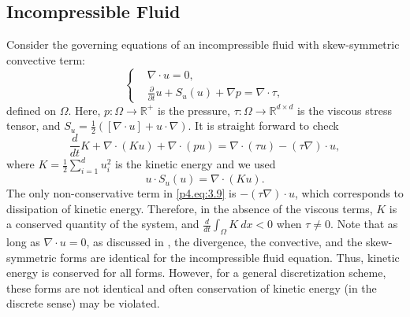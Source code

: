 \subsection{Incompressible Fluid} \label{p4.sec:skew.2}
Consider the governing equations of an incompressible fluid with skew-symmetric convective term:
\begin{equation} \label{p4.eq:3.8}
	\left\{
	\begin{aligned}
	&\nabla \cdot u = 0, \\
	&\frac{\partial}{\partial t} u + S_{u}(u) + \nabla p = \nabla \cdot \tau,
	\end{aligned}
	\right.
\end{equation}
defined on $\Omega$. Here, $p: \Omega \to \mathbb R^+$ is the pressure, $\tau: \Omega \to \mathbb R^{d\times d}$ is the viscous stress tensor, and $S_u = \frac 1 2 ([ \nabla \cdot u] + u\cdot \nabla)$. It is straight forward to check
\begin{equation} \label{p4.eq:3.9}
	\frac{d}{dt} K + \nabla \cdot (Ku) + \nabla \cdot (pu)= \nabla \cdot (\tau u) - (\tau \nabla)\cdot u,
\end{equation}
where $K = \frac 1 2 \sum_{i=1}^d u_i^2 $ is the kinetic energy and we used 
\begin{equation} \label{p4.eq:3.11}
	u\cdot S_{u}(u) = \nabla \cdot(Ku).
\end{equation}
The only non-conservative term in \eqref{p4.eq:3.9} is $-(\tau \nabla)\cdot u$, which corresponds to dissipation of kinetic energy. Therefore, in the absence of the viscous terms, $K$ is a conserved quantity of the system, and $\frac d {dt} \int_{\Omega} K \ dx <0$ when $\tau\neq 0$. Note that as long as $\nabla \cdot u = 0$, as discussed in , the divergence, the convective, and the skew-symmetric forms are identical for the incompressible fluid equation. Thus, kinetic energy is conserved for all forms. However, for a general discretization scheme, these forms are not identical and often conservation of kinetic energy (in the discrete sense) may be violated.

